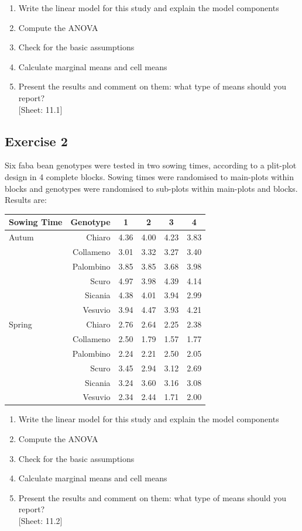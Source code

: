 \documentclass[a4paper,12pt,oneside]{book}
\providecommand{\tightlist}{%
  \setlength{\itemsep}{0pt}\setlength{\parskip}{0pt}}
\begin{document}
\begin{enumerate}
\def\labelenumi{\arabic{enumi}.}
\tightlist
\item
  Write the linear model for this study and explain the model components
\item
  Compute the ANOVA
\item
  Check for the basic assumptions
\item
  Calculate marginal means and cell means
\item
  Present the results and comment on them: what type of means should you report?\\
  {[}Sheet: 11.1{]}
\end{enumerate}

\hypertarget{exercise-2-7}{%
\subsection{Exercise 2}\label{exercise-2-7}}

Six faba bean genotypes were tested in two sowing times, according to a plit-plot design in 4 complete blocks. Sowing times were randomised to main-plots within blocks and genotypes were randomised to sub-plots within main-plots and blocks. Results are:

\begin{longtable}[]{@{}lrcccc@{}}
\toprule
Sowing Time & Genotype & 1 & 2 & 3 & 4 \\
\midrule
\endhead
Autum & Chiaro & 4.36 & 4.00 & 4.23 & 3.83 \\
& Collameno & 3.01 & 3.32 & 3.27 & 3.40 \\
& Palombino & 3.85 & 3.85 & 3.68 & 3.98 \\
& Scuro & 4.97 & 3.98 & 4.39 & 4.14 \\
& Sicania & 4.38 & 4.01 & 3.94 & 2.99 \\
& Vesuvio & 3.94 & 4.47 & 3.93 & 4.21 \\
Spring & Chiaro & 2.76 & 2.64 & 2.25 & 2.38 \\
& Collameno & 2.50 & 1.79 & 1.57 & 1.77 \\
& Palombino & 2.24 & 2.21 & 2.50 & 2.05 \\
& Scuro & 3.45 & 2.94 & 3.12 & 2.69 \\
& Sicania & 3.24 & 3.60 & 3.16 & 3.08 \\
& Vesuvio & 2.34 & 2.44 & 1.71 & 2.00 \\
\bottomrule
\end{longtable}

\begin{enumerate}
\def\labelenumi{\arabic{enumi}.}
\tightlist
\item
  Write the linear model for this study and explain the model components
\item
  Compute the ANOVA
\item
  Check for the basic assumptions
\item
  Calculate marginal means and cell means
\item
  Present the results and comment on them: what type of means should you report?\\
  {[}Sheet: 11.2{]}
\end{enumerate}
\end{document}
